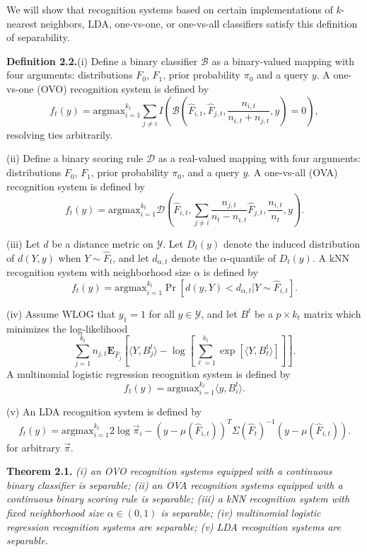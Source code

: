 \documentclass{article}
\newcommand{\E}{\textbf{E}}
\newcommand{\argmax}{\text{argmax}}
\begin{document}
We will show that recognition systems based on certain implementations of $k$-nearest neighbors, LDA, one-vs-one, or one-vs-all classifiers satisfy this definition of separability.  

\textbf{Definition 2.2.}(i)  Define a binary classifier $\mathcal{B}$ as a binary-valued mapping with four arguments: distributions $F_0$, $F_1$, prior probability $\pi_0$ and a query $y$.  A one-vs-one (OVO) recognition system is defined by
\[
f_t(y) = \argmax_{i=1}^{k_t} \sum_{j \neq i} I\left(\mathcal{B}(\hat{F}_{i, t}, \hat{F}_{j, t}, \frac{n_{i, t}}{n_{i, t} + n_{j, t}}, y)=0\right),
\]
resolving ties arbitrarily.

(ii) Define a binary scoring rule $\mathcal{D}$ as a real-valued mapping with four arguments:
distributions $F_0$, $F_1$, prior probability $\pi_0$, and a query $y$. 
A one-vs-all (OVA) recognition system is defined by
\[
f_t(y) = \argmax_{i=1}^{k_t} \mathcal{D}\left(\hat{F}_{i, t}, \sum_{j\neq i} \frac{n_{j, t}}{n_t - n_{i, t}}\hat{F}_{j, t}, \frac{n_{i, t}}{n_t}, y\right).
\]

(iii) Let $d$ be a distance metric on $\mathcal{Y}$.
Let $D_t(y)$ denote the induced distribution of $d(Y, y)$ when $Y \sim \hat{F}_t$,
and let $d_{\alpha, t}$ denote the $\alpha$-quantile of $D_t(y)$.
A kNN recognition system with neighborhood size $\alpha$ is defined by
\[
f_t(y) = \argmax_{i=1}^{k_t} \Pr[d(y, Y) < d_{\alpha, t} |Y \sim \hat{F}_{i, t}].
\]

(iv) Assume WLOG that $y_1 = 1$ for all $y \in \mathcal{Y}$, and
let $B^t$ be a $p \times k_t$ matrix which minimizes the log-likelihood
\[
\sum_{j=1}^{k_t}n_{j, t}\E_{\hat{F}_j}\left[\langle Y, B^t_j \rangle - \log\left[\sum_{\ell=1}^{k_t} \exp[\langle Y, B^t_\ell \rangle]\right]\right].
\]
A multinomial logistic regression recognition system is defined by
\[
f_t(y) = \argmax_{i=1}^{k_t} \langle y, B^t_i\rangle.
\]

(v) An LDA recognition system is defined by
\[
f_t(y) = \argmax_{i=1}^{k_t} 2\log \vec{\pi}_i -(y-\mu(\hat{F}_{i, t}))^T \Sigma(\hat{F}_t)^{-1} (y-\mu(\hat{F}_{i, t})).
\]
for arbitrary $\vec{\pi}$.

\textbf{Theorem 2.1.} \emph{(i) an OVO recognition systems equipped with a continuous binary classifier is separable; (ii) an OVA recognition systems equipped with a continuous binary scoring rule is separable;
(iii) a kNN recognition system with fixed neighborhood size $\alpha \in (0, 1)$ is separable; (iv) multinomial logistic regression recognition systems are separable; (v) LDA recognition systems are separable.}
\end{document}
